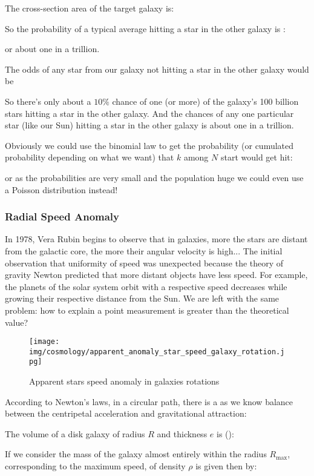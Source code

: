 	The cross-section area of the target galaxy is:
	
	
	So the probability of a typical average hitting a star in the other galaxy is :
	
	or about one in a trillion.
	
	The odds of any star from our galaxy not hitting a star in the other galaxy would be
	
	So there's only about a $10\%$ chance of one (or more) of the galaxy's 100 billion stars hitting a star in the other galaxy. And the chances of any one particular star (like our Sun) hitting a star in the other galaxy is about one in a trillion.
	\begin{tcolorbox}[title=Remark,colframe=black,arc=10pt]
	Obviously we could use the binomial law to get the probability (or cumulated probability depending on what we want) that $k$ among $N$ start would get hit:
	
	or as the probabilities are very small and the population huge we could even use a Poisson distribution instead!
	\end{tcolorbox}
	
	\subsubsection{Radial Speed Anomaly}
	In 1978, Vera Rubin begins to observe that in galaxies, more the stars are distant from the galactic core, the more their angular velocity is high... The initial observation that uniformity of speed was unexpected because the theory of gravity Newton predicted that more distant objects have less speed. For example, the planets of the solar system orbit with a respective speed decreases while growing their respective distance from the Sun. We are left with the same problem: how to explain a point measurement is greater than the theoretical value?
	\begin{figure}[H]
		\centering
		\texttt{[image: img/cosmology/apparent\_anomaly\_star\_speed\_galaxy\_rotation.jpg]}	
		\caption{Apparent stars speed anomaly in galaxies rotations}
	\end{figure}
	According to Newton's laws, in a circular path, there is a as we know balance between the centripetal acceleration and gravitational attraction:
	
	The volume of a disk galaxy of radius $R$ and thickness $e$ is ():
	
	If we consider the mass of the galaxy almost entirely within the radius $R _ {\max}$, corresponding to the maximum speed, of density $\rho$ is given then by:
	
